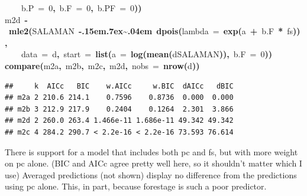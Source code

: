 \documentclass{article}
\makeatletter
\newcommand{\hlnumber}[1]{\textcolor[rgb]{0,0,0}{#1}}%
\newcommand{\hlfunctioncall}[1]{\textcolor[rgb]{.5,0,.33}{\textbf{#1}}}%
\newcommand{\hlkeyword}[1]{\textbf{#1}}%
\newcommand{\hlargument}[1]{\textcolor[rgb]{.69,.25,.02}{#1}}%
\newcommand{\hlassignement}[1]{\textbf{#1}}%
\newcommand{\hlsymbol}[1]{#1}%
\def\urltilda{\kern -.15em\lower .7ex\hbox{\~{}}\kern .04em}%
\newcommand{\hlstd}[1]{\textcolor[rgb]{0,0,0}{#1}}%
\newenvironment{kframe}{%
 \def\FrameCommand##1{\hskip\@totalleftmargin \hskip-\fboxsep
 \colorbox{shadecolor}{##1}\hskip-\fboxsep
     \hskip-\linewidth \hskip-\@totalleftmargin \hskip\columnwidth}%
 \MakeFramed {\advance\hsize-\width
   \@totalleftmargin\z@ \linewidth\hsize
   \@setminipage}}%
 {\par\unskip\endMakeFramed}
\newenvironment{knitrout}{}{} %
\makeatother
\begin{document}
\begin{knitrout}
{\begin{kframe}
\begin{flushleft}
\hlstd{}{\ }{\ }{\ }{\ }\hlargument{b.P}{\ }\hlargument{=}{\ }\hlnumber{0}\hlkeyword{,}{\ }\hlargument{b.F}{\ }\hlargument{=}{\ }\hlnumber{0}\hlkeyword{,}{\ }\hlargument{b.PF}{\ }\hlargument{=}{\ }\hlnumber{0}\hlkeyword{)}\hlkeyword{)}\hspace*{\fill}\\
\hlstd{}\hlsymbol{m2d}{\ }\hlassignement{\usebox{\hlnormalsizeboxlessthan}-}{\ }\hlfunctioncall{mle2}\hlkeyword{(}\hlsymbol{SALAMAN}{\ }\hlkeyword{\urltilda{}}{\ }\hlfunctioncall{dpois}\hlkeyword{(}\hlargument{lambda}{\ }\hlargument{=}{\ }\hlfunctioncall{exp}\hlkeyword{(}\hlsymbol{a}{\ }\hlkeyword{+}{\ }\hlsymbol{b.F}{\ }\hlkeyword{*}{\ }\hlsymbol{fs}\hlkeyword{)}\hlkeyword{)}\hlkeyword{,}\hspace*{\fill}\\
\hlstd{}{\ }{\ }{\ }{\ }\hlargument{data}{\ }\hlargument{=}{\ }\hlsymbol{d}\hlkeyword{,}{\ }\hlargument{start}{\ }\hlargument{=}{\ }\hlfunctioncall{list}\hlkeyword{(}\hlargument{a}{\ }\hlargument{=}{\ }\hlfunctioncall{log}\hlkeyword{(}\hlfunctioncall{mean}\hlkeyword{(}\hlsymbol{d}\hlkeyword{\usebox{\hlnormalsizeboxdollar}}\hlsymbol{SALAMAN}\hlkeyword{)}\hlkeyword{)}\hlkeyword{,}{\ }\hlargument{b.F}{\ }\hlargument{=}{\ }\hlnumber{0}\hlkeyword{)}\hlkeyword{)}\hspace*{\fill}\\
\hlstd{}\hlfunctioncall{compare}\hlkeyword{(}\hlsymbol{m2a}\hlkeyword{,}{\ }\hlsymbol{m2b}\hlkeyword{,}{\ }\hlsymbol{m2c}\hlkeyword{,}{\ }\hlsymbol{m2d}\hlkeyword{,}{\ }\hlargument{nobs}{\ }\hlargument{=}{\ }\hlfunctioncall{nrow}\hlkeyword{(}\hlsymbol{d}\hlkeyword{)}\hlkeyword{)}\mbox{}
\normalfont
\end{flushleft}
\begin{verbatim}
##     k  AICc   BIC    w.AICc     w.BIC  dAICc   dBIC
## m2a 2 210.6 214.1    0.7596    0.8736  0.000  0.000
## m2b 3 212.9 217.9    0.2404    0.1264  2.301  3.866
## m2d 2 260.0 263.4 1.466e-11 1.686e-11 49.342 49.342
## m2c 4 284.2 290.7 < 2.2e-16 < 2.2e-16 73.593 76.614
\end{verbatim}
\end{kframe}}
\end{knitrout}


There is support for a model that includes both pc and fs, but with more weight on pc alone. 
(BIC and AICc agree pretty well here, so it shouldn't matter which I use)
Averaged predictions (not shown) display no difference from the predictions using pc alone. 
This, in part, because forestage is such a poor predictor. 
\end{document}
